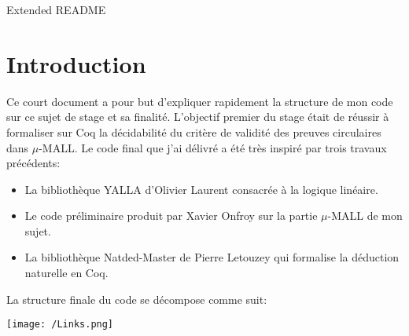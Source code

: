 \documentclass[12pt]{article}
\theoremstyle{break}
\begin{document}
\begin{center}
{\large Extended README} \\ %
\end{center}
\section{Introduction}
Ce court document a pour but d'expliquer rapidement la structure de mon code sur ce sujet de stage et sa finalité.
L'objectif premier du stage était de réussir à formaliser sur Coq la décidabilité du critère de validité des preuves circulaires
dans $\mu$-MALL. 
Le code final que j'ai délivré a été très inspiré par trois travaux précédents:
\begin{itemize}
\item La bibliothèque YALLA d'Olivier Laurent consacrée à la logique linéaire.
\item Le code préliminaire produit par Xavier Onfroy sur la partie $\mu$-MALL de mon sujet.
\item La bibliothèque Natded-Master de Pierre Letouzey qui formalise la déduction naturelle en Coq.
\end{itemize}
La structure finale du code se décompose comme suit: 
\begin{center}
\texttt{[image: /Links.png]}
\end{center}
\end{document}
